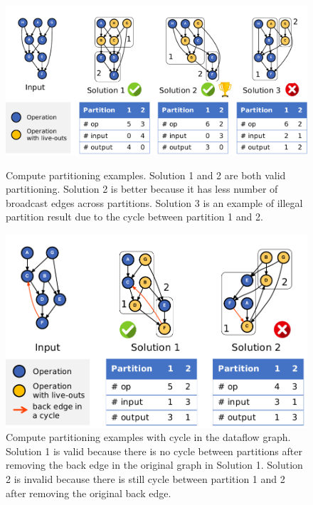 \begin{figure}
  \centering
  \includegraphics[width=1\columnwidth]{figs/parteg.pdf}
  \caption[Compute partitioning examples]{
    Compute partitioning examples. Solution 1 and 2 are both valid partitioning. Solution 2 is
    better because it has less number of broadcast edges across partitions. Solution 3 is an example
    of illegal partition result due to the cycle between partition 1 and 2.
  }
  \label{fig:parteg}

  \includegraphics[width=0.8\columnwidth]{figs/partcycleeg.pdf}
  \caption[Compute partitioning examples with cycle]{
    Compute partitioning examples with cycle in the dataflow graph.
    Solution 1 is valid because there is no 
    cycle between partitions after removing the back edge in
    the original graph in Solution 1. 
    Solution 2 is invalid because there is still cycle between partition 1 and 2 after
    removing the original back edge.
  }
  \label{fig:parteg}
\end{figure}

